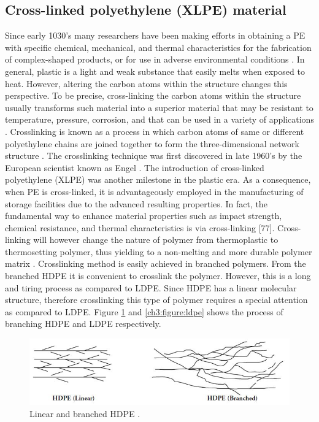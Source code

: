 \documentclass[12pt]{report}
\begin{document}
\subsection{Cross-linked polyethylene (XLPE) material}

Since early 1030’s many researchers have been making efforts in obtaining a PE with specific chemical, mechanical, and thermal characteristics for the fabrication of complex-shaped products, or for use in adverse environmental conditions \cite{kurtz2009cross}. In general, plastic is a light and weak substance that easily melts when exposed to heat. However, altering the carbon atoms within the structure changes this perspective. To be precise, cross-linking the carbon atoms within the structure usually transforms such material into a superior material that may be resistant to temperature, pressure, corrosion, and that can be used in a variety of applications \cite{meola2005cross}. Crosslinking is known as a process in which carbon atoms of same or different polyethylene chains are joined together to form the three-dimensional network structure \cite{kurtz2009cross}.
The crosslinking technique was first discovered in late 1960’s by the European scientist known as Engel \cite{meola2005cross}. The introduction of cross-linked polyethylene (XLPE) was another milestone in the plastic era. As a consequence, when PE is cross-linked, it is advantageously employed in the manufacturing of storage facilities due to the advanced resulting properties. In fact, the fundamental way to enhance material properties such as impact strength, chemical resistance, and thermal characteristics is via cross-linking [77]. Cross-linking will however change the nature of polymer from thermoplastic to thermosetting polymer, thus yielding to a non-melting and more durable polymer matrix \cite{clemens2017microstructure}. Crosslinking method is easily achieved in branched polymers. From the branched HDPE it is convenient to crosslink the polymer. However, this is a long and tiring process as compared to LDPE.
Since HDPE has a linear molecular structure, therefore crosslinking this type of polymer requires a special attention as compared to LDPE. Figure \ref{ch3:figure:hdpe} and \ref{ch3:figure:ldpe} shows the process of branching HDPE and LDPE respectively.
 
\begin{figure}[H]
    \centering
    \includegraphics[width=\textwidth]{linear_and_branched_hdpe.jpg}
    \caption{Linear and branched HDPE \cite{gabriel1998history}.}
    \label{ch3:figure:hdpe}
\end{figure}
\end{document}
